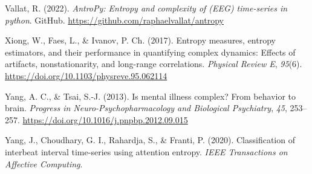 \documentclass[
  man]{apa6}
\newlength{\cslhangindent}
\newlength{\cslentryspacingunit} %
\newenvironment{CSLReferences}[2] %
 {%
  \setlength{\parindent}{0pt}
  \ifodd #1
  \let\oldpar\par
  \def\par{\hangindent=\cslhangindent\oldpar}
  \fi
  \setlength{\parskip}{#2\cslentryspacingunit}
 }%
 {}
\begin{document}
\begin{CSLReferences}{1}{0}
\leavevmode{}%
Vallat, R. (2022). \emph{AntroPy: Entropy and complexity of (EEG) time-series in python}. GitHub. \url{https://github.com/raphaelvallat/antropy}

\leavevmode{}%
Xiong, W., Faes, L., \& Ivanov, P. Ch. (2017). Entropy measures, entropy estimators, and their performance in quantifying complex dynamics: Effects of artifacts, nonstationarity, and long-range correlations. \emph{Physical Review E}, \emph{95}(6). \url{https://doi.org/10.1103/physreve.95.062114}

\leavevmode{}%
Yang, A. C., \& Tsai, S.-J. (2013). Is mental illness complex? From behavior to brain. \emph{Progress in Neuro-Psychopharmacology and Biological Psychiatry}, \emph{45}, 253--257. \url{https://doi.org/10.1016/j.pnpbp.2012.09.015}

\leavevmode{}%
Yang, J., Choudhary, G. I., Rahardja, S., \& Franti, P. (2020). Classification of interbeat interval time-series using attention entropy. \emph{IEEE Transactions on Affective Computing}.

\end{CSLReferences}


\clearpage
\renewcommand{\listfigurename}{Figure captions}
\end{document}

